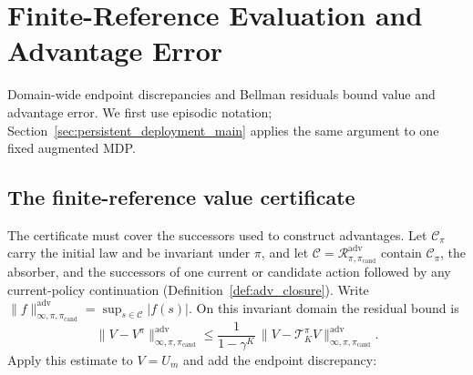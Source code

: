 \documentclass{article}
\theoremstyle{plain}
\theoremstyle{definition}
\theoremstyle{remark}
\begin{document}
\section{Finite-Reference Evaluation and Advantage Error}
\label{sec:error_bounds}

Domain-wide endpoint discrepancies and Bellman residuals bound value and
advantage error. We first use episodic notation;
Section~\ref{sec:persistent_deployment_main} applies the same argument to one
fixed augmented MDP.

\subsection{The finite-reference value certificate}
\label{sec:value_error_bounds}
The certificate must cover the successors used to construct advantages. Let
$\mathcal C_\pi$ carry the initial law and be invariant under $\pi$, and let
$\mathcal C=\mathcal R^{\mathrm{adv}}_{\pi,\pi_{\mathrm{cand}}}$ contain
$\mathcal C_\pi$, the absorber, and the successors of one current or candidate
action followed by any current-policy continuation
(Definition~\ref{def:adv_closure}). Write
$\|f\|_{\infty,\pi,\pi_{\mathrm{cand}}}^{\mathrm{adv}}
=\sup_{s\in\mathcal C}|f(s)|$. On this invariant domain the residual bound
is
\begin{equation}
\|V - V^\pi\|_{\infty,\pi,\pi_{\mathrm{cand}}}^{\mathrm{adv}}
\le
\frac{1}{1-\gamma^K}\,
\|V-\mathcal{T}^\pi_K V\|_{\infty,\pi,\pi_{\mathrm{cand}}}^{\mathrm{adv}}.
\label{eq:boundA}
\end{equation}
Apply this estimate to $V=U_m$ and add the endpoint discrepancy:
\end{document}
